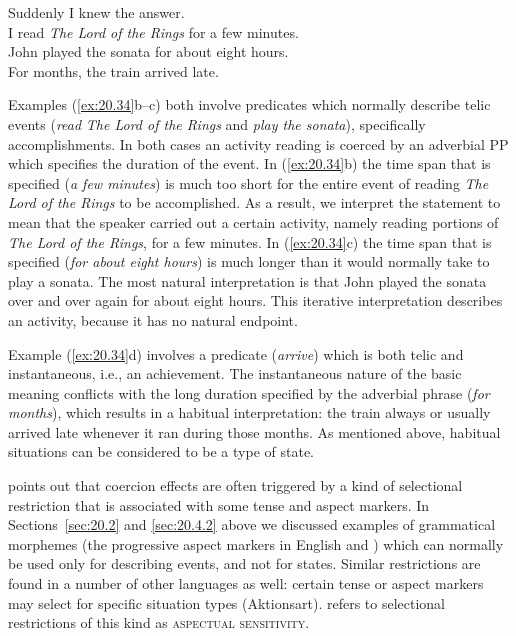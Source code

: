 \ea \label{ex:20.34}
\ea  Suddenly I knew the answer.\\
\ex I read \textit{The Lord of the Rings} for a few minutes.\\
\ex John played the sonata for about eight hours.\\
\ex For months, the train arrived late.
                       \z
\z


Examples (\ref{ex:20.34}b--c) both involve predicates which normally describe telic events (\textit{read} \textit{The Lord of the Rings} and \textit{play the sonata}), specifically accomplishments. In both cases an activity reading is coerced by an adverbial PP which specifies the duration of the event. In (\ref{ex:20.34}b) the time span that is specified (\textit{a few minutes}) is much too short for the entire event of reading \textit{The Lord of the Rings} to be accomplished. As a result, we interpret the statement to mean that the speaker carried out a certain activity, namely reading portions of \textit{The Lord of the Rings}, for a few minutes. In (\ref{ex:20.34}c) the time span that is specified (\textit{for about eight hours}) is much longer than it would normally take to play a sonata. The most natural interpretation is that John played the sonata over and over again for about eight hours. This iterative interpretation describes an activity, because it has no natural endpoint.



Example (\ref{ex:20.34}d) involves a predicate (\textit{arrive}) which is both telic and instantaneous, i.e., an achievement. The instantaneous nature of the basic meaning conflicts with the long duration specified by the adverbial phrase (\textit{for months}), which results in a habitual interpretation: the train always or usually arrived late whenever it ran during those months. As mentioned above, habitual situations can be considered to be a type of state.



 points out that coercion effects are often triggered by a kind of selectional restriction that is associated with some tense and aspect markers. In Sections~\ref{sec:20.2} and \ref{sec:20.4.2} above we discussed examples of grammatical morphemes (the progressive aspect markers in English and ) which can normally be used only for describing events, and not for states. Similar restrictions are found in a number of other languages as well: certain tense or aspect markers may select for specific situation types (Aktionsart).  refers to selectional restrictions of this kind as \textsc{aspectual sensitivity}.



